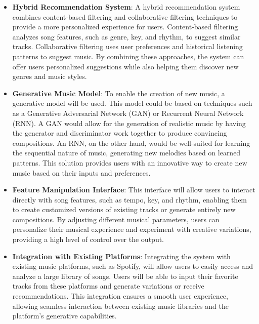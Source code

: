 \documentclass[12pt]{article}
\begin{document}
\begin{itemize}
    \item \textbf{Hybrid Recommendation System}: 
    A hybrid recommendation system combines content-based filtering and collaborative filtering techniques to provide a more personalized experience for users. Content-based filtering analyzes song features, such as genre, key, and rhythm, to suggest similar tracks. Collaborative filtering uses user preferences and historical listening patterns to suggest music. By combining these approaches, the system can offer users personalized suggestions while also helping them discover new genres and music styles.

    \item \textbf{Generative Music Model}: 
    To enable the creation of new music, a generative model will be used. This model could be based on techniques such as a Generative Adversarial Network (GAN) or Recurrent Neural Network (RNN). A GAN would allow for the generation of realistic music by having the generator and discriminator work together to produce convincing compositions. An RNN, on the other hand, would be well-suited for learning the sequential nature of music, generating new melodies based on learned patterns. This solution provides users with an innovative way to create new music based on their inputs and preferences.

    \item \textbf{Feature Manipulation Interface}: 
    This interface will allow users to interact directly with song features, such as tempo, key, and rhythm, enabling them to create customized versions of existing tracks or generate entirely new compositions. By adjusting different musical parameters, users can personalize their musical experience and experiment with creative variations, providing a high level of control over the output.

    \item \textbf{Integration with Existing Platforms}: 
    Integrating the system with existing music platforms, such as Spotify, will allow users to easily access and analyze a large library of songs. Users will be able to input their favorite tracks from these platforms and generate variations or receive recommendations. This integration ensures a smooth user experience, allowing seamless interaction between existing music libraries and the platform's generative capabilities.

\end{itemize}
\end{document}
